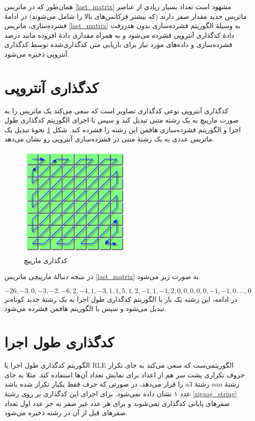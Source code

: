 همان‌طور که در ماتریس 
\ref{last_matrix}
مشهود است تعداد بسیار زیادی از عناصر ماتریس جدید
مقدار صفر دارند (که بیشتر فرکانس‌های بالا را شامل می‌شوند)
در ادامهٔ فشرده‌سازی، ماتریس 
\ref{last_matrix}
به وسیلهٔ الگوریتم فشرده‌‌سازی بدون هدررفت دادهٔ
کدگذاری آنتروپی 
فشرده می‌شود و به همراه مقداری 
دادهٔ افزوده
مانند درصد فشرده‌سازی و داده‌های مورد نیاز برای بازیابی متن کدگذاری‌شده توسط کدگذاری آنتروپی ذخیره می‌شود. 
\section{کدگذاری آنتروپی}
کدگذاری آنتروپی نوعی کدگذاری تصاویر است که سعی می‌کند یک ماتریس را به صورت مارپیچ به یک رشته متنی تبدیل کند و سپس با اجرای
الگوریتم کدگذاری طول اجرا و الگوریتم فشرده‌سازی هافمن این رشته را فشرده کند. شکل 
\ref{zigzag}
نحوهٔ تبدیل یک ماتریس عددی به یک رشتهٔ متنی در فشرده‌سازی آنتروپی رو نشان می‌دهد.

\begin{figure}[H]
        \centering
        \includegraphics[width=0.5\textwidth]{figs/zigzag.png}
        \caption[کدگذاری مارپیچ]{کدگذاری مارپیچ \cite{zigzag}}
        \label{zigzag}
\end{figure}
در نتیجه دنبالهٔ مارپیچی ماتریس \ref{last_matrix} به صورت زیر می‌شود. 

\begin{equation}
        -26, -3, 0, -3, -2, -6, 2, -4, 1, -3, 1, 1, 5, 1, 2, -1, 1, -1, 2, 0, 0, 0, 0, 0, -1, -1, 0 , \dots, 0
        \label{zigzag_string}
\end{equation}
در ادامه، این رشته یک بار با الگوریتم کدگذاری طول اجرا 
به یک رشتهٔ جدید کوتاه‌تر تبدیل می‌شود و سپس با الگوریتم هافمن فشرده می‌شود. 

\section{کدگذاری طول اجرا}
الگوریتم کدگذاری طول اجرا یا RLE الگوریتمی‌ست که سعی می‌کند
به جای تکرار حروف تکراری پشت سر هم از اعداد برای نمایش تعداد آن‌ها استفاده کند. مثلا به جای رشتهٔ 
$aaa$
رشتهٔ 
$a3$ 
را قرار می‌دهد، در صورتی که حرف فقط یکبار تکرار شده باشد عدد ۱ نشان داده نمی‌شود. برای اجرای این کدگذاری بر روی 
رشتهٔ \ref{zigzag_string} صفرهای پایانی کدگذاری نمی‌شوند و برای هر عدد غیر صفر به جز عدد اول تعداد صفرهای قبل از آن
در رشته ذخیره می‌شود.
